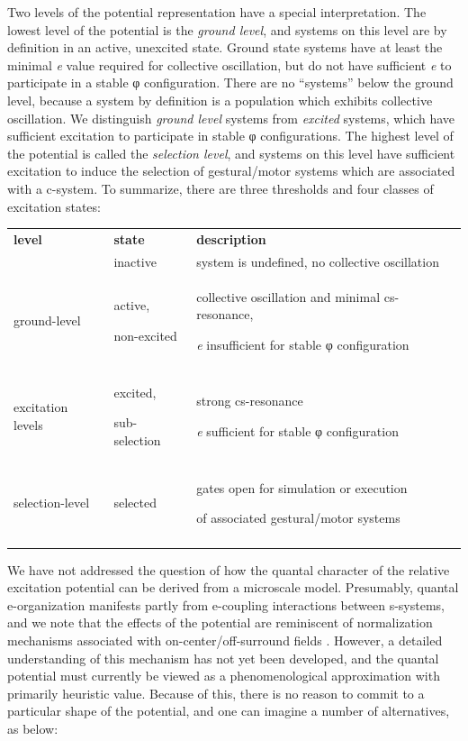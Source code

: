   Two levels of the potential representation have a special  interpretation. The lowest level of the potential is the \textit{ground level}, and systems on this level are by definition in an active, unexcited state. Ground state systems have at least the minimal \textit{e} value required for collective oscillation, but do not have sufficient \textit{e} to participate in a stable φ configuration. There are no “systems” below the ground level, because a system by definition is a population which exhibits collective oscillation. We distinguish \textit{ground level} systems from \textit{excited} systems, which have sufficient excitation to participate in stable φ configurations. The highest level of the potential is called the \textit{selection level}, and systems on this level have sufficient excitation to induce the selection of gestural/motor systems which are associated with a c-system. To summarize, there are three thresholds and four classes of excitation states:

\begin{tabularx}{\textwidth}{XXX}
\lsptoprule
\textbf{level} & \textbf{state} & \textbf{description}\\
& inactive & system is undefined, no collective oscillation\\
\raggedleft ground-level & active,

non-excited & collective oscillation and minimal cs-resonance, 

\textit{e} insufficient for stable φ configuration\\
\raggedleft excitation levels & excited,

sub-selection & strong cs-resonance

\textit{e} sufficient for stable φ configuration\\
\raggedleft selection-level & selected & gates open for simulation or execution 

of associated gestural/motor systems\\
\lspbottomrule
\end{tabularx}
  We have not addressed the question of how the quantal character of the relative excitation potential can be derived from a microscale model. Presumably, quantal e-organization manifests partly from e-coupling interactions between s-systems, and we note that the effects of the potential are reminiscent of normalization mechanisms associated with on-center/off-surround fields \citep{Grossberg1978,Grossberg1987}. However, a detailed understanding of this mechanism has not yet been developed, and the quantal potential must currently be viewed as a phenomenological approximation with primarily heuristic value. Because of this, there is no reason to commit to a particular shape of the potential, and one can imagine a number of alternatives, as below:

